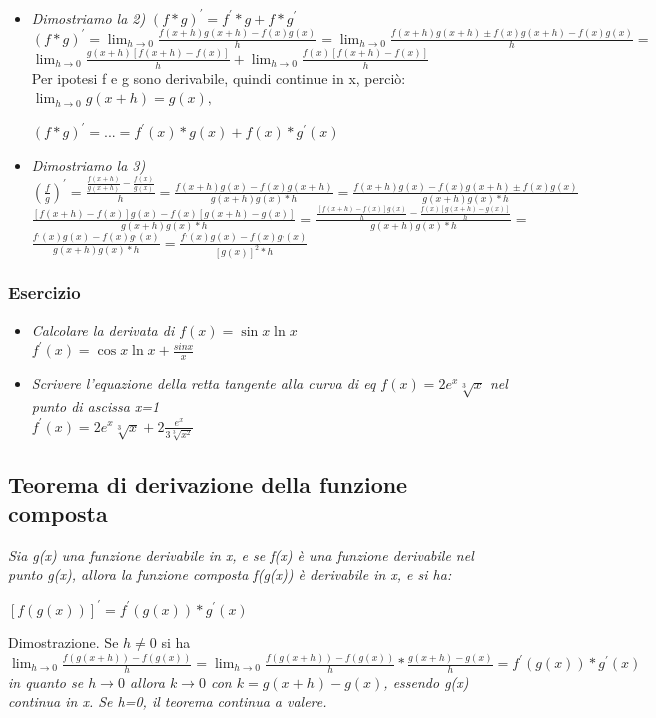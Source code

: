 \begin{itemize}
	\item \textit{Dimostriamo la 2)} $(f*g)^\prime=f^\prime*g+f*g^\prime$\\
		$(f*g)^\prime=\lim_{h\to 0}\frac{f(x+h)g(x+h)-f(x)g(x)}{h}=\lim_{h\to
0}\frac{f(x+h)g(x+h)\pm f(x)g(x+h)-f(x)g(x)}{h}=$\\
		$\lim_{h\to
0}\frac{g(x+h)[f(x+h)-f(x)]}{h}+\lim_{h\to 0}\frac{f(x)[f(x+h)-f(x)]}{h}$\\
Per ipotesi f e g sono derivabile, quindi continue in x, perciò:\\
$\lim_{h\to 0}g(x+h)=g(x),$
\begin{center}
	$(f*g)^\prime=...=f^\prime(x)*g(x)+f(x)*g^\prime(x)$
\end{center}
\item \textit{Dimostriamo la 3)}\\
	$(\frac{f}{g})^\prime=\frac{\frac{f(x+h)}{g(x+h)}-\frac{f(x)}{g(x)}}{h}=\frac{f(x+h)g(x)-f(x)g(x+h)}{g(x+h)g(x)*h}=\frac{f(x+h)g(x)-f(x)g(x+h)\pm
		f(x)g(x)}{g(x+h)g(x)*h}$\\
		$\frac{[f(x+h)-f(x)]g(x)-f(x)[g(x+h)-g(x)]}{g(x+h)g(x)*h}=\frac{\frac{[f(x+h)-f(x)]g(x)}{h}-\frac{f(x)[g(x+h)-g(x)]}{h}}{g(x+h)g(x)*h}=$\\$\frac{f^,(x)g(x)-f(x)g^,(x)}{g(x+h)g(x)*h}=\frac{f^,(x)g(x)-f(x)g^,(x)}{[g(x)]^2*h}$

\end{itemize}
\subsubsection{Esercizio}
\begin{itemize}
	\item \textit{Calcolare la derivata di $f(x)=\sin x \ln x$}\\
		$f^\prime(x)=\cos x \ln x+\frac{sin x}{x}$
	\item \textit{Scrivere l'equazione della retta tangente alla curva di eq
		$f(x)=2e^x\sqrt[3]{x}$ nel punto di ascissa x=1}\\
		$f^\prime(x)=2e^x\sqrt[3]{x}+2\frac{e^x}{3\sqrt[3]{x^2}}$
\end{itemize}
\subsection{Teorema di derivazione della funzione composta}
\textit{Sia g(x) una funzione derivabile in x, e se f(x) è una funzione
derivabile nel punto g(x), allora la funzione composta f(g(x)) è derivabile in
x, e si ha:}
\begin{center}
	$[f(g(x))]^\prime=f^\prime(g(x))*g^\prime(x)$
\end{center}
Dimostrazione. Se $h\neq 0$ si ha $\lim_{h\to
0}\frac{f(g(x+h))-f(g(x))}{h}=\lim_{h\to
0}\frac{f(g(x+h))-f(g(x))}{h}*\frac{g(x+h)-g(x)}{h}=f^\prime(g(x))*g^\prime(x)$
\textit{in quanto se $h\to 0$ allora $k\to 0$ con $k=g(x+h)-g(x)$, essendo
g(x) continua in x. Se h=0, il teorema continua a valere.}
